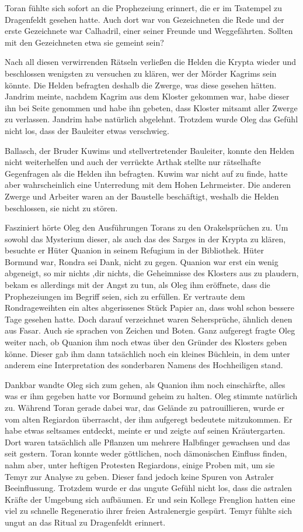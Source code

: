 Toran fühlte sich sofort an die Prophezeiung erinnert, die er im Tsatempel zu Dragenfeldt gesehen hatte. Auch dort war von Gezeichneten die Rede und der erste Gezeichnete war Calhadril, einer seiner Freunde und Weggefährten. Sollten mit den Gezeichneten etwa sie gemeint sein?

Nach all diesen verwirrenden Rätseln verließen die Helden die Krypta wieder und beschlossen wenigsten zu versuchen zu klären, wer der Mörder Kagrims sein könnte. Die Helden befragten deshalb die Zwerge, was diese gesehen hätten. Jandrim meinte, nachdem Kagrim aus dem Kloster gekommen war, habe dieser ihn bei Seite genommen und habe ihn gebeten, dass Kloster mitsamt aller Zwerge zu verlassen. Jandrim habe natürlich abgelehnt. Trotzdem wurde Oleg das Gefühl nicht los, dass der Bauleiter etwas verschwieg.

Ballasch, der Bruder Kuwims und stellvertretender Bauleiter, konnte den Helden nicht weiterhelfen und auch der verrückte Arthak stellte nur rätselhafte Gegenfragen als die Helden ihn befragten. Kuwim war nicht auf zu finde, hatte aber wahrscheinlich eine Unterredung mit dem Hohen Lehrmeister. Die anderen Zwerge und Arbeiter waren an der Baustelle beschäftigt, weshalb die Helden beschlossen, sie nicht zu stören.

Fasziniert hörte Oleg den Ausführungen Torans zu den Orakelsprüchen zu. Um sowohl das Mysterium dieser, als auch das des Sarges in der Krypta zu klären, besuchte er Hüter Quanion in seinem Refugium in der Bibliothek. Hüter Bormund war, Rondra sei Dank, nicht zu gegen. Quanion war erst ein wenig abgeneigt, so mir nichts ,dir nichts, die Geheimnisse des Klosters aus zu plaudern, bekam es allerdings mit der Angst zu tun, als Oleg ihm eröffnete, dass die Prophezeiungen im Begriff seien, sich zu erfüllen. Er vertraute dem Rondrageweihten ein altes abgerissenes Stück Papier an, dass wohl schon bessere Tage gesehen hatte. Doch darauf verzeichnet waren Sehersprüche, ähnlich denen aus Fasar. Auch sie sprachen von Zeichen und Boten. Ganz aufgeregt fragte Oleg weiter nach, ob Quanion ihm noch etwas über den Gründer des Klosters geben könne. Dieser gab ihm dann tatsächlich noch ein kleines Büchlein, in dem unter anderem eine Interpretation des sonderbaren Namens des Hochheiligen stand. 


Dankbar wandte Oleg sich zum gehen, als Quanion ihm noch einschärfte, alles was er ihm gegeben hatte vor Bormund geheim zu halten. Oleg stimmte natürlich zu. Während Toran gerade dabei war, das Gelände zu patrouillieren, wurde er vom alten Regiardon überrascht, der ihm aufgeregt bedeutete mitzukommen. Er habe etwas seltsames entdeckt, meinte er und zeigte auf seinen Kräutergarten. Dort waren tatsächlich alle Pflanzen um mehrere Halbfinger gewachsen und das seit gestern. Toran konnte weder göttlichen, noch dämonischen Einfluss finden, nahm aber, unter heftigen Protesten Regiardons, einige Proben mit, um sie Temyr zur Analyse zu geben. Dieser fand jedoch keine Spuren von Astraler Beeinflussung. Trotzdem wurde er das ungute Gefühl nicht los, dass die astralen Kräfte der Umgebung sich aufbäumen. Er und sein Kollege Frenglion hatten eine viel zu schnelle Regeneratio ihrer freien Astralenergie gespürt. Temyr fühlte sich ungut an das Ritual zu Dragenfeldt erinnert.


